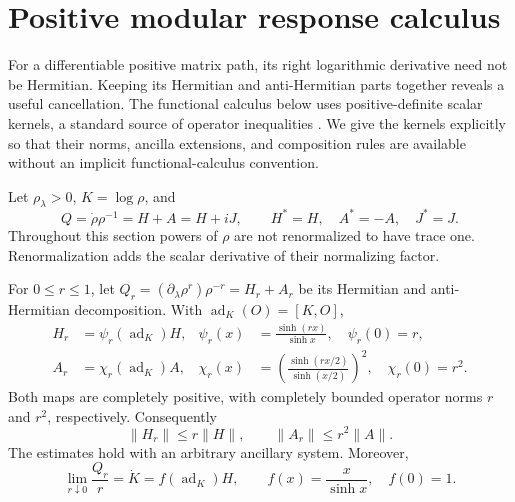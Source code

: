 \section{Positive modular response calculus}
\label{q:sec-kms}

For a differentiable positive matrix path, its right logarithmic
derivative need not be Hermitian.  Keeping its Hermitian and
anti-Hermitian parts together reveals a useful cancellation.  The
functional calculus below uses positive-definite scalar kernels, a
standard source of operator inequalities
\cite{q:HK1999,q:BP2000}.  We give the kernels explicitly so that their
norms, ancilla extensions, and composition rules are available without
an implicit functional-calculus convention.

Let $\rho_\lambda>0$, $K=\log\rho$, and
\[
 Q=\dot\rho\rho^{-1}=H+A=H+iJ,
 \qquad H^*=H,\quad A^*=-A,\quad J^*=J.
\]
Throughout this section powers of $\rho$ are not renormalized to have
trace one.  Renormalization adds the scalar derivative of their
normalizing factor.

\begin{theorem}
\label{q:thm-powers}
For $0\leq r\leq1$, let
$Q_r=(\partial_\lambda\rho^r)\rho^{-r}=H_r+A_r$ be its Hermitian and
anti-Hermitian decomposition.  With $\operatorname{ad}_K(O)=[K,O]$,
\begin{align}
 H_r&=\psi_r(\operatorname{ad}_K)H,
 &\psi_r(x)&=\frac{\sinh(rx)}{\sinh x},\quad\psi_r(0)=r,
 \label{q:power-H}\\
 A_r&=\chi_r(\operatorname{ad}_K)A,
 &\chi_r(x)&=\left(\frac{\sinh(rx/2)}{\sinh(x/2)}\right)^2,
 \quad\chi_r(0)=r^2.
 \label{q:power-A}
\end{align}
Both maps are completely positive, with completely bounded
operator norms $r$ and $r^2$, respectively.  Consequently
\[
 \|H_r\|\leq r\|H\|,\qquad
 \|A_r\|\leq r^2\|A\|.
\]
The estimates hold with an arbitrary ancillary system.  Moreover,
\begin{equation}
 \lim_{r\downarrow0}\frac{Q_r}{r}
 =\dot K=f(\operatorname{ad}_K)H,
 \qquad f(x)=\frac{x}{\sinh x},\quad f(0)=1.
 \label{q:log-response}
\end{equation}
\end{theorem}

